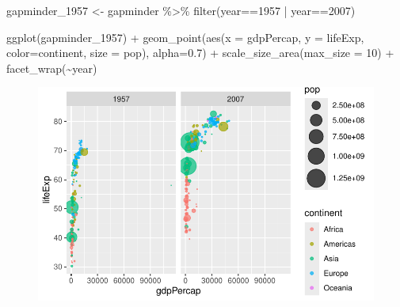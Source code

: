 \documentclass[
  letterpaper,
  DIV=11,
  numbers=noendperiod]{scrartcl}
\newenvironment{Shaded}{\begin{snugshade}}{\end{snugshade}}
\newcommand{\AttributeTok}[1]{\textcolor[rgb]{0.40,0.45,0.13}{#1}}
\newcommand{\DecValTok}[1]{\textcolor[rgb]{0.68,0.00,0.00}{#1}}
\newcommand{\FloatTok}[1]{\textcolor[rgb]{0.68,0.00,0.00}{#1}}
\newcommand{\FunctionTok}[1]{\textcolor[rgb]{0.28,0.35,0.67}{#1}}
\newcommand{\NormalTok}[1]{\textcolor[rgb]{0.00,0.23,0.31}{#1}}
\newcommand{\OtherTok}[1]{\textcolor[rgb]{0.00,0.23,0.31}{#1}}
\newcommand{\SpecialCharTok}[1]{\textcolor[rgb]{0.37,0.37,0.37}{#1}}
\begin{document}
\begin{Shaded}
\begin{Highlighting}[]
\NormalTok{gapminder\_1957 }\OtherTok{\textless{}{-}}\NormalTok{ gapminder }\SpecialCharTok{\%\textgreater{}\%} \FunctionTok{filter}\NormalTok{(year}\SpecialCharTok{==}\DecValTok{1957} \SpecialCharTok{|}\NormalTok{ year}\SpecialCharTok{==}\DecValTok{2007}\NormalTok{)}

\FunctionTok{ggplot}\NormalTok{(gapminder\_1957) }\SpecialCharTok{+} 
  \FunctionTok{geom\_point}\NormalTok{(}\FunctionTok{aes}\NormalTok{(}\AttributeTok{x =}\NormalTok{ gdpPercap, }\AttributeTok{y =}\NormalTok{ lifeExp, }\AttributeTok{color=}\NormalTok{continent,}
                 \AttributeTok{size =}\NormalTok{ pop), }\AttributeTok{alpha=}\FloatTok{0.7}\NormalTok{) }\SpecialCharTok{+} 
  \FunctionTok{scale\_size\_area}\NormalTok{(}\AttributeTok{max\_size =} \DecValTok{10}\NormalTok{) }\SpecialCharTok{+}
  \FunctionTok{facet\_wrap}\NormalTok{(}\SpecialCharTok{\textasciitilde{}}\NormalTok{year)}
\end{Highlighting}
\end{Shaded}

\begin{figure}[H]

{\centering \includegraphics{Class05_files/figure-pdf/unnamed-chunk-32-1.pdf}

}

\end{figure}
\end{document}
